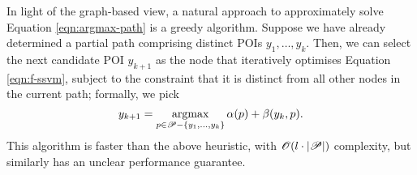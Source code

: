 
In light of the graph-based view, a natural approach to approximately solve Equation \ref{eqn:argmax-path} is a greedy algorithm.
Suppose we have already determined a partial path comprising distinct POIs $y_1, \ldots, y_k$.
Then, we can select the next candidate POI $y_{k + 1}$ as
the node
that iteratively optimises Equation \ref{eqn:f-ssvm},
subject to the constraint that it is distinct from all other nodes in the current path;
formally, we pick
$$ y_{k + 1} = \operatorname*{argmax}_{p \in \mathscr{P} - \{ y_1, \ldots, y_k \}} \alpha( p ) + \beta( y_k, p ). $$
This algorithm is faster than the above heuristic, with $\mathscr{O}(l \cdot | \mathscr{P} |)$ complexity,
but similarly has an unclear performance guarantee.

